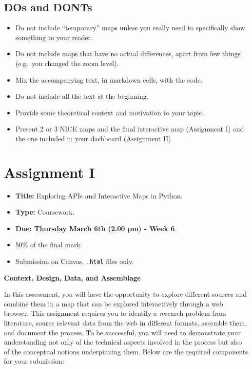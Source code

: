 \documentclass[
  letterpaper,
  DIV=11,
  numbers=noendperiod]{scrreprt}
\providecommand{\tightlist}{%
  \setlength{\itemsep}{0pt}\setlength{\parskip}{0pt}}\usepackage{longtable,booktabs,array}
\begin{document}
\section*{DOs and DONTs}\label{dos-and-donts}


\begin{itemize}
\tightlist
\item
  Do not include ``temporary'' maps unless you really need to
  specifically show something to your reader.\\
\item
  Do not include maps that have no actual differences, apart from few
  things (e.g.~you changed the zoom level).
\item
  Mix the accompanying text, in markdown cells, with the code.
\item
  Do not include all the text at the beginning.
\item
  Provide some theoretical context and motivation to your topic.
\item
  Present 2 or 3 NICE maps and the final interactive map (Assignment I)
  and the one included in your dashboard (Assignment II)
\end{itemize}


\chapter*{Assignment I}\label{assignment-i}


\begin{itemize}
\tightlist
\item
  \textbf{Title:} Exploring APIs and Interactive Maps in Python.
\item
  \textbf{Type:} Coursework.
\item
  \textbf{Due: Thursday March 6th (2.00 pm) - Week 6}.
\item
  50\% of the final mark.
\item
  Submission on Canvas, \texttt{.html} files only.
\end{itemize}

\textbf{Context, Design, Data, and Assemblage}

In this assessment, you will have the opportunity to explore different
sources and combine them in a map that can be explored interactively
through a web browser. This assignment requires you to identify a
research problem from literature, source relevant data from the web in
different formats, assemble them, and document the process. To be
successful, you will need to demonstrate your understanding not only of
the technical aspects involved in the process but also of the conceptual
notions underpinning them. Below are the required components for your
submission:
\end{document}
